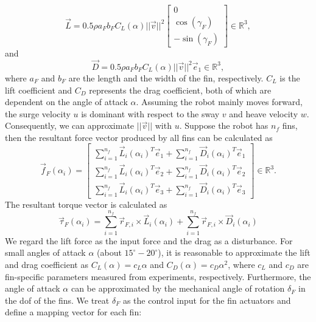 \begin{equation}
\vec{L}=0.5 \rho a_{F}b_{F}C_{L}(\alpha)||\vec{v}||^{2}
\begin{bmatrix}
0\\ \cos(\gamma_{F}) \\ -\sin(\gamma_{F})
\end{bmatrix} \in \mathbb{R}^{3},
\end{equation} and 
\begin{equation}
\vec{D} = 0.5 \rho a_{F}b_{F}C_{L}(\alpha)||\vec{v}||^{2}\vec{e}_{1} \in \mathbb{R}^{3},
\end{equation}
where $a_{F}$ and $b_{F}$ are the length and the width of the fin, respectively. $C_{L}$ is the lift coefficient and $C_{D}$ represents the drag coefficient, both of which are dependent on the angle of attack $\alpha$. Assuming the robot mainly moves forward, the surge velocity $u$ is dominant with respect to the sway $v$ and heave velocity $w$. Consequently, we can approximate $||\vec{v}||$ with $u$. Suppose the robot has $n_{f}$ fins, then the resultant force vector produced by all fins can be calculated as
\begin{equation}
\vec{f}_{F}(\alpha_{i})=
\begin{bmatrix}
\sum _{ i=1 }^{ n_{f} }{ \vec{L}_{ i }(\alpha _{ i })^{ T }\vec{e}_{ 1 }+ } \sum _{ i=1 }^{ n_{f} }{ \vec{D}_{ i }(\alpha _{ i })^{ T }\vec{e}_{ 1 } }  \\ \sum _{ i=1 }^{ n_{f} }{\vec{L}_{ i }(\alpha _{ i })^{ T }\vec{e}_{ 2 }+ } \sum _{ i=1 }^{ n_{f} }{ \vec{D}_{ i }(\alpha _{ i })^{ T }\vec{e}_{ 2 } }  \\ \sum _{ i=1 }^{ n_{f} }{ \vec{L}_{ i }(\alpha _{ i })^{ T }\vec{e}_{ 3 }+ } \sum _{ i=1 }^{n_{f} }{ \vec{D}_{ i }(\alpha _{ i })^{ T }\vec{e}_{ 3 } } 
\end{bmatrix} \in \mathbb{R}^{3}.
\end{equation} 
The resultant torque vector is calculated as 
\begin{equation}
\vec{\tau} _{F}(\alpha_{i} )=\sum _{ i=1 }^{n_{f}}{ \vec{r}_{F,i} \times \vec{L}_{i}(\alpha_{i}) } +\sum _{ i=1 }^{n_{f}}{ \vec{r}_{F,i} \times \vec{D}_{i}(\alpha_{i})}
\end{equation}
We regard the lift force as the input force and the drag as a disturbance. For small angles of attack $\alpha$ (about $15^\circ-20^\circ$), it is reasonable to approximate the lift and drag coefficient as $C_{L}(\alpha)=c_{L}\alpha$ and $C_{D}(\alpha)=c_{D}\alpha^{2}$, where $c_{L}$ and $c_{D}$ are fin-specific parameters measured from experiments, respectively. Furthermore, the angle of attack $\alpha$ can be approximated by the mechanical angle of rotation $\delta_{F}$ in the \ac{dof} of the fins. We treat $\delta_{F}$ as the control input for the fin actuators and define a mapping vector for each fin:  
